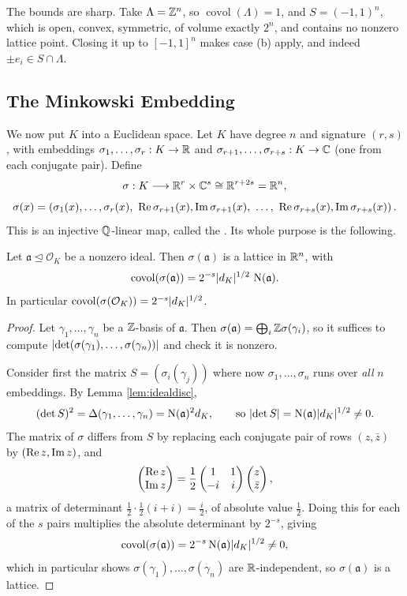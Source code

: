\documentclass[a4paper]{scrartcl}
\renewcommand{\OO}{\mathcal{O}}
\newcommand{\Nm}{\operatorname{N}}
\newcommand{\covol}{\operatorname{covol}}
\newcommand{\fa}{\mathfrak{a}}
\begin{document}
\begin{remark}
	The bounds are sharp. Take $\Lambda = \mathbb{Z}^n$, so $\covol(\Lambda) = 1$, and $S = (-1,1)^n$, which is open, convex, symmetric, of volume exactly $2^n$, and contains no nonzero lattice point. Closing it up to $[-1,1]^n$ makes case (b) apply, and indeed $\pm e_i \in S\cap\Lambda$.
\end{remark}

\subsection{The Minkowski Embedding}

We now put $K$ into a Euclidean space. Let $K$ have degree $n$ and signature $(r,s)$, with embeddings $\sigma_1,\dots,\sigma_r : K \to \mathbb{R}$ and $\sigma_{r+1},\dots,\sigma_{r+s} : K \to \mathbb{C}$ (one from each conjugate pair). Define
$$\sigma : K \longrightarrow \mathbb{R}^r\times\mathbb{C}^s \cong \mathbb{R}^{r+2s} = \mathbb{R}^n,$$
$$\sigma(x) = \left(\sigma_1(x),\dots,\sigma_r(x),\ \re\sigma_{r+1}(x),\im\sigma_{r+1}(x),\ \dots,\ \re\sigma_{r+s}(x),\im\sigma_{r+s}(x)\right).$$
This is an injective $\mathbb{Q}$-linear map, called the . Its whole purpose is the following.

\begin{lemma}\label{lem:latticecovol}
	Let $\fa \trianglelefteq \OO_K$ be a nonzero ideal. Then $\sigma(\fa)$ is a lattice in $\mathbb{R}^n$, with
	$$\covol(\sigma(\fa)) = 2^{-s}\abs{d_K}^{1/2}\,\Nm(\fa).$$
	In particular $\covol(\sigma(\OO_K)) = 2^{-s}\abs{d_K}^{1/2}$.
\end{lemma}

\begin{proof}
	Let $\gamma_1,\dots,\gamma_n$ be a $\mathbb{Z}$-basis of $\fa$. Then $\sigma(\fa) = \bigoplus_i\Z\sigma(\gamma_i)$, so it suffices to compute $\lvert\det(\sigma(\gamma_1),\dots,\sigma(\gamma_n))\rvert$ and check it is nonzero.

	Consider first the matrix $S = (\sigma_i(\gamma_j))$ where now $\sigma_1,\dots,\sigma_n$ runs over \emph{all} $n$ embeddings. By Lemma \ref{lem:idealdisc},
	$$(\det S)^2 = \Delta(\gamma_1,\dots,\gamma_n) = \Nm(\fa)^2 d_K, \qquad \text{so } \abs{\det S} = \Nm(\fa)\abs{d_K}^{1/2} \neq 0.$$
	The matrix of $\sigma$ differs from $S$ by replacing each conjugate pair of rows $(z, \bar z)$ by $(\operatorname{Re} z, \operatorname{Im} z)$, and
	$$\begin{pmatrix}\operatorname{Re} z\\ \operatorname{Im} z\end{pmatrix} = \frac12\begin{pmatrix}1 & 1\\ -i & i\end{pmatrix}\begin{pmatrix}z \\ \bar z\end{pmatrix},$$
	a matrix of determinant $\tfrac12 \cdot \tfrac{1}{2}(i+i)= \tfrac{i}{2}$, of absolute value $\tfrac12$. Doing this for each of the $s$ pairs multiplies the absolute determinant by $2^{-s}$, giving
	$$\covol(\sigma(\fa)) = 2^{-s}\Nm(\fa)\abs{d_K}^{1/2} \neq 0,$$
	which in particular shows $\sigma(\gamma_1),\dots,\sigma(\gamma_n)$ are $\mathbb{R}$-independent, so $\sigma(\fa)$ is a lattice.
\end{proof}
\end{document}
